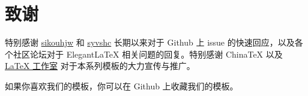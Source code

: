\documentclass[lang=cn,a4paper]{elegantpaper}
\begin{document}
\section{致谢}

特别感谢 \href{https://github.com/sikouhjw}{sikouhjw} 和 \href{https://github.com/syvshc}{syvshc}  长期以来对于 Github 上 issue 的快速回应，以及各个社区论坛对于 ElegantLaTeX 相关问题的回复。特别感谢 ChinaTeX 以及 \href{http://www.latexstudio.net/}{LaTeX 工作室} 对于本系列模板的大力宣传与推广。

如果你喜欢我们的模板，你可以在 Github 上收藏我们的模板。

\nocite{*}
\printbibliography[heading=bibintoc, title=\ebibname]

\appendix
\addappheadtotoc
\end{document}
